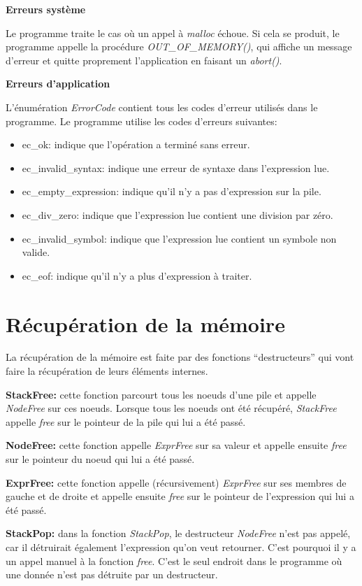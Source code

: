 \documentclass[10pt]{report}
\begin{document}
\textbf{Erreurs système}

Le programme traite le cas où un appel à \emph{malloc} échoue. Si cela se
produit, le programme appelle la procédure \emph{OUT\_OF\_MEMORY()}, qui affiche un message
d'erreur et quitte proprement l'application en faisant un \emph{abort()}.

\textbf{Erreurs d'application}

L'énumération \emph{ErrorCode} contient tous les codes d'erreur utilisés dans
le programme. Le programme utilise les codes d'erreurs suivantes:

\begin{itemize}
\item ec\_ok: indique que l'opération a terminé sans erreur.
\item ec\_invalid\_syntax: indique une erreur de syntaxe dans l'expression
lue.
\item ec\_empty\_expression: indique qu'il n'y a pas d'expression sur la pile. 
\item ec\_div\_zero: indique que l'expression lue contient une division par
zéro.
\item ec\_invalid\_symbol: indique que l'expression lue contient un symbole
non valide.
\item ec\_eof: indique qu'il n'y a plus d'expression à traiter.
\end{itemize}


\section{Récupération de la mémoire}

La récupération de la mémoire est faite par des fonctions
``destructeurs'' qui vont faire la récupération de leurs éléments
internes.

\textbf{StackFree:} cette fonction parcourt tous les noeuds d'une pile
et appelle \emph{NodeFree} sur ces noeuds.  Lorsque tous les noeuds
ont été récupéré, \emph{StackFree} appelle \emph{free} sur le pointeur
de la pile qui lui a été passé.

\textbf{NodeFree:} cette fonction appelle \emph{ExprFree} sur sa
valeur et appelle ensuite \emph{free} sur le pointeur du noeud qui lui
a été passé.

\textbf{ExprFree:} cette fonction appelle (récursivement)
\emph{ExprFree} sur ses membres de gauche et de droite et appelle
ensuite \emph{free} sur le pointeur de l'expression qui lui a été
passé.

\textbf{StackPop:} dans la fonction \emph{StackPop}, le destructeur
\emph{NodeFree} n'est pas appelé, car il détruirait également
l'expression qu'on veut retourner.  C'est pourquoi il y a un appel
manuel à la fonction \emph{free}.  C'est le seul endroit dans le
programme où une donnée n'est pas détruite par un destructeur.
\end{document}
